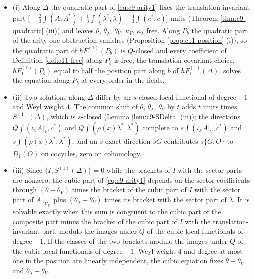 \begin{proposition}
\label{prop:c11-arity1}
\begin{itemize}
\item (i) Along $\Delta$ the quadratic part of \eqref{eq:c9-arity1} fixes the translation-invariant part $\big[-\tfrac23\int(A,A^*)+\tfrac13\int(\lambda^*,\lambda)+\tfrac43\int(c^*,c)\big]$ units (Theorem \ref{thm:c9-quadratic} (iii)) and leaves $\theta$, $\theta_\lambda$, $\theta_V$, $\kappa_V$, $\kappa_\lambda$ free. Along $P_b$ the quadratic part of the arity-one obstruction vanishes (Proposition \ref{prop:c11-position} (i)), so the quadratic part of $\hbar F_1^{(1)}(P_b)$ is $Q$-closed and every coefficient of Definition \ref{def:c11-free} along $P_b$ is free; the translation-covariant choice, $\hbar F_1^{(1)}(P_b)$ equal to half the position part along $b$ of $\hbar F_1^{(1)}(\Delta)$, solves the equation along $P_b$ at every order in the fields.
\item (ii) Two solutions along $\Delta$ differ by an $s$-closed local functional of degree $-1$ and Weyl weight $4$. The common shift of $\theta$, $\theta_\lambda$, $\theta_V$ by $t$ adds $t$ units times $S^{(1)}(\Delta)$, which is $s$-closed (Lemma \ref{lem:c9-SDelta} (iii)); the directions $Q\int(\iota_xA|_V,c^*)$ and $Q\int(\rho(x)\lambda^*,\lambda^*)$ complete to $s\int(\iota_xA|_V,c^*)$ and $s\int(\rho(x)\lambda^*,\lambda^*)$, and an $s$-exact direction $sG$ contributes $s\{G,O\}$ to $D_1(O)$ on cocycles, zero on cohomology.
\item (iii) Since $\{I,S^{(1)}(\Delta)\}=0$ while the brackets of $I$ with the sector parts are nonzero, the cubic part of \eqref{eq:c9-arity1} depends on the sector coefficients through $(\theta-\theta_V)$ times the bracket of the cubic part of $I$ with the sector part of $A|_{W_{\mathbb R}^\perp}$ plus $(\theta_\lambda-\theta_V)$ times its bracket with the sector part of $\lambda$. It is solvable exactly when this sum is congruent to the cubic part of the composite part minus the bracket of the cubic part of $I$ with the translation-invariant part, modulo the images under $Q$ of the cubic local functionals of degree $-1$. If the classes of the two brackets modulo the images under $Q$ of the cubic local functionals of degree $-1$, Weyl weight $4$ and degree at most one in the position are linearly independent, the cubic equation fixes $\theta-\theta_V$ and $\theta_\lambda-\theta_V$.
\end{itemize}
\end{proposition}

